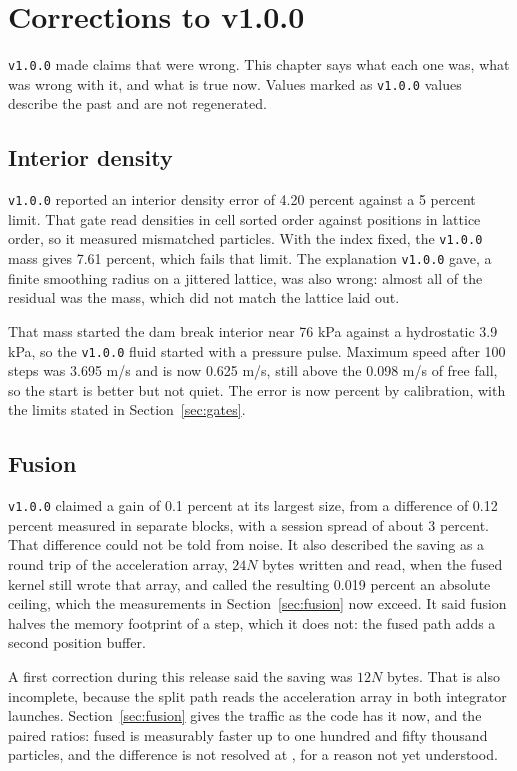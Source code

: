 \chapter{Corrections to v1.0.0}
\label{ch:corrections}

\texttt{v1.0.0} made claims that were wrong. This chapter says what each one was, what
was wrong with it, and what is true now. Values marked as \texttt{v1.0.0} values describe
the past and are not regenerated.

\section{Interior density}

\texttt{v1.0.0} reported an interior density error of 4.20 percent against a 5 percent
limit. That gate read densities in cell sorted order against positions in lattice order,
so it measured mismatched particles. With the index fixed, the \texttt{v1.0.0} mass gives
7.61 percent, which fails that limit. The explanation \texttt{v1.0.0} gave, a finite
smoothing radius on a jittered lattice, was also wrong: almost all of the residual was the
mass, which did not match the lattice laid out.

That mass started the dam break interior near 76 kPa against a hydrostatic 3.9 kPa, so the
\texttt{v1.0.0} fluid started with a pressure pulse. Maximum speed after 100 steps was
3.695 m/s and is now 0.625 m/s, still above the 0.098 m/s of free fall, so the start is
better but not quiet. The error is now \SphDensityErrorPercent{} percent by calibration,
with the limits stated in Section~\ref{sec:gates}.

\section{Fusion}

\texttt{v1.0.0} claimed a gain of 0.1 percent at its largest size, from a difference of
0.12 percent measured in separate blocks, with a session spread of about 3 percent. That
difference could not be told from noise. It also described the saving as a round trip of
the acceleration array, $24N$ bytes written and read, when the fused kernel still wrote
that array, and called the resulting 0.019 percent an absolute ceiling, which the
measurements in Section~\ref{sec:fusion} now exceed. It said fusion halves the memory
footprint of a step, which it does not: the fused path adds a second position buffer.

A first correction during this release said the saving was $12N$ bytes. That is also
incomplete, because the split path reads the acceleration array in both integrator
launches. Section~\ref{sec:fusion} gives the traffic as the code has it now, and the
paired ratios: fused is measurably faster up to one hundred and fifty thousand particles,
and the difference is not resolved at \LadderMaxN{}, for a reason not yet understood.

